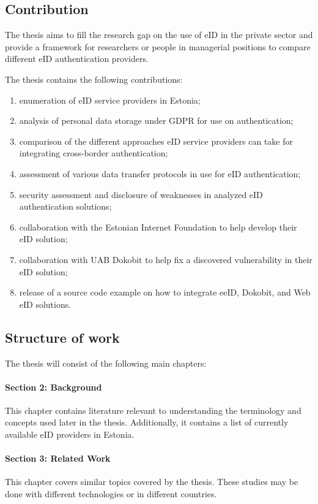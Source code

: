 \subsection{Contribution}

The thesis aims to fill the research gap on the use of eID in the private sector and provide a framework for researchers or people in managerial positions to compare different eID authentication providers.

The thesis contains the following contributions:

\begin{enumerate}
    \item enumeration of eID service providers in Estonia;
    \item analysis of personal data storage under GDPR for use on authentication;
    \item comparison of the different approaches eID service providers can take for integrating cross-border authentication;
    \item assessment of various data transfer protocols in use for eID authentication;
    \item security assessment and disclosure of weaknesses in analyzed eID authentication solutions;
    \item collaboration with the Estonian Internet Foundation to help develop their eID solution;
    \item collaboration with UAB Dokobit to help fix a discovered vulnerability in their eID solution;
    \item release of a source code example on how to integrate eeID, Dokobit, and Web eID solutions.
\end{enumerate}

\subsection{Structure of work}


The thesis will consist of the following main chapters:

\paragraph{Section 2: Background} This chapter contains literature relevant to understanding the terminology and concepts used later in the thesis. Additionally, it contains a list of currently available eID providers in Estonia.
\paragraph{Section 3: Related Work} This chapter covers similar topics covered by the thesis. These studies may be done with different technologies or in different countries.
